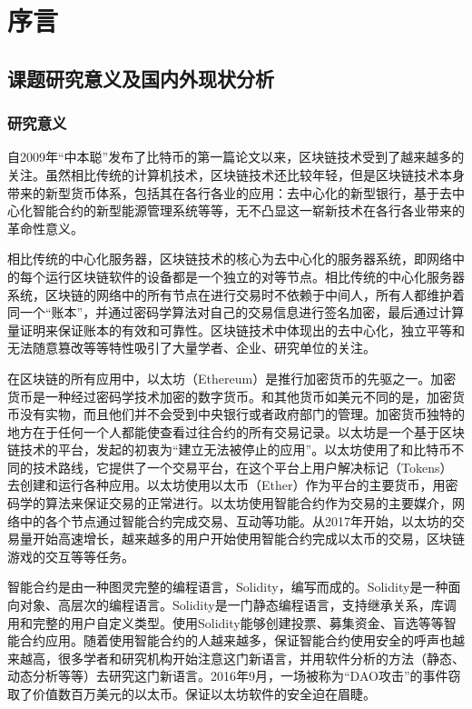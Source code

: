 
\chapter{序言}

\section{课题研究意义及国内外现状分析}

\subsection{研究意义}
自2009年“中本聪”发布了比特币的第一篇论文以来，区块链技术受到了越来越多的关注。虽然相比传统的计算机技术，区块链技术还比较年轻，但是区块链技术本身带来的新型货币体系，包括其在各行各业的应用：去中心化的新型银行\cite{blockchain-application}，基于去中心化智能合约的新型能源管理系统\cite{blockchain-in-energy}等等，无不凸显这一崭新技术在各行各业带来的革命性意义。

相比传统的中心化服务器，区块链技术的核心为去中心化的服务器系统，即网络中的每个运行区块链软件的设备都是一个独立的对等节点\cite{区块链技术及其应用研究}。相比传统的中心化服务器系统，区块链的网络中的所有节点在进行交易时不依赖于中间人，所有人都维护着同一个“账本”，并通过密码学算法对自己的交易信息进行签名加密，最后通过计算量证明来保证账本的有效和可靠性。区块链技术中体现出的去中心化，独立平等和无法随意篡改等等特性吸引了大量学者、企业、研究单位的关注。

在区块链的所有应用中，以太坊（Ethereum）是推行加密货币的先驱之一。加密货币是一种经过密码学技术加密的数字货币。和其他货币如美元不同的是，加密货币没有实物，而且他们并不会受到中央银行或者政府部门的管理。加密货币独特的地方在于任何一个人都能使查看过往合约的所有交易记录。以太坊是一个基于区块链技术的平台，发起的初衷为“建立无法被停止的应用”\cite{eth-intro}。以太坊使用了和比特币不同的技术路线，它提供了一个交易平台，在这个平台上用户解决标记（Tokens）去创建和运行各种应用。以太坊使用以太币（Ether）作为平台的主要货币，用密码学的算法来保证交易的正常进行。以太坊使用智能合约作为交易的主要媒介，网络中的各个节点通过智能合约完成交易、互动等功能。从2017年开始，以太坊的交易量开始高速增长\cite{eth-chart}，越来越多的用户开始使用智能合约完成以太币的交易，区块链游戏的交互等等任务。

智能合约是由一种图灵完整的编程语言，Solidity，编写而成的。Solidity是一种面向对象、高层次的编程语言。Solidity是一门静态编程语言，支持继承关系，库调用和完整的用户自定义类型。使用Solidity能够创建投票、募集资金、盲选等等智能合约应用。随着使用智能合约的人越来越多，保证智能合约使用安全的呼声也越来越高，很多学者和研究机构开始注意这门新语言，并用软件分析的方法（静态、动态分析等等）去研究这门新语言。2016年9月，一场被称为“DAO攻击”的事件窃取了价值数百万美元的以太币\cite{dao-attack}。保证以太坊软件的安全迫在眉睫。

